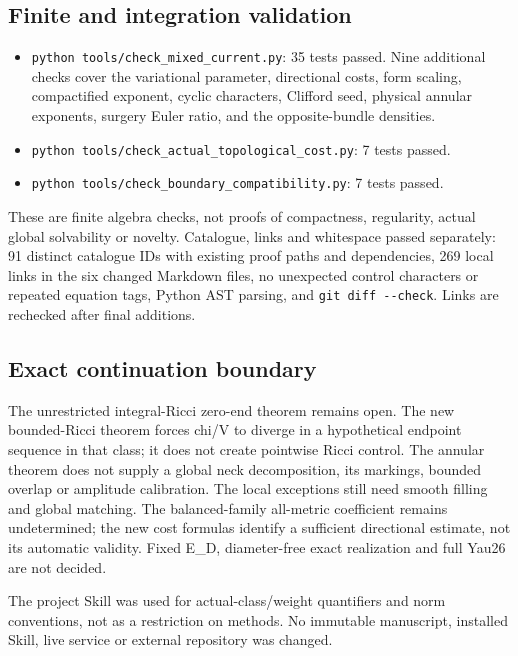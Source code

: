 \documentclass[
  10pt,
]{article}
\providecommand{\tightlist}{%
  \setlength{\itemsep}{0pt}\setlength{\parskip}{0pt}}
\begin{document}
\hypertarget{finite-and-integration-validation}{%
\subsection{Finite and integration
validation}\label{finite-and-integration-validation}}

\begin{itemize}
\tightlist
\item
  \texttt{python\ tools/check\_mixed\_current.py}: 35 tests passed. Nine
  additional checks cover the variational parameter, directional costs,
  form scaling, compactified exponent, cyclic characters, Clifford seed,
  physical annular exponents, surgery Euler ratio, and the
  opposite-bundle densities.
\item
  \texttt{python\ tools/check\_actual\_topological\_cost.py}: 7 tests
  passed.
\item
  \texttt{python\ tools/check\_boundary\_compatibility.py}: 7 tests
  passed.
\end{itemize}

These are finite algebra checks, not proofs of compactness, regularity,
actual global solvability or novelty. Catalogue, links and whitespace
passed separately: 91 distinct catalogue IDs with existing proof paths
and dependencies, 269 local links in the six changed Markdown files, no
unexpected control characters or repeated equation tags, Python AST
parsing, and \texttt{git\ diff\ -\/-check}. Links are rechecked after
final additions.

\hypertarget{exact-continuation-boundary}{%
\subsection{Exact continuation
boundary}\label{exact-continuation-boundary}}

The unrestricted integral-Ricci zero-end theorem remains open. The new
bounded-Ricci theorem forces chi/V to diverge in a hypothetical endpoint
sequence in that class; it does not create pointwise Ricci control. The
annular theorem does not supply a global neck decomposition, its
markings, bounded overlap or amplitude calibration. The local exceptions
still need smooth filling and global matching. The balanced-family
all-metric coefficient remains undetermined; the new cost formulas
identify a sufficient directional estimate, not its automatic validity.
Fixed E\_D, diameter-free exact realization and full Yau26 are not
decided.

The project Skill was used for actual-class/weight quantifiers and norm
conventions, not as a restriction on methods. No immutable manuscript,
installed Skill, live service or external repository was changed.
\end{document}
